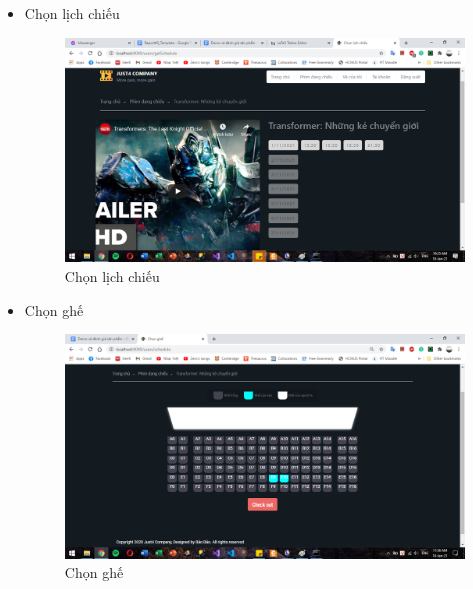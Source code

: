 \documentclass[a4paper, 12pt]{article}
\begin{document}
\begin{itemize}
	\item Chọn lịch chiếu
	\begin{figure}[H]
		\begin{center}
			\includegraphics[scale=0.5]{./image/demo_movieSchedule.png}
			\caption{Chọn lịch chiếu}
		\end{center}
	\end{figure}

	\item Chọn ghế
	\begin{figure}[H]
		\begin{center}
			\includegraphics[scale=0.5]{./image/demo_seatBooking.png}
			\caption{Chọn ghế}
		\end{center}
	\end{figure}


\end{itemize}
\end{document}
